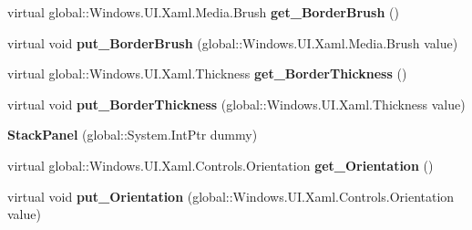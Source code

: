 \begin{DoxyCompactItemize}
\item 
\mbox{\label{class_windows_1_1_u_i_1_1_xaml_1_1_controls_1_1_stack_panel_ade57d63ba167e564115c51076407b86d}} 
virtual global\+::\+Windows.\+U\+I.\+Xaml.\+Media.\+Brush {\bfseries get\+\_\+\+Border\+Brush} ()
\item 
\mbox{\label{class_windows_1_1_u_i_1_1_xaml_1_1_controls_1_1_stack_panel_a9465b7d293751e261c9deb8f5bbc74f1}} 
virtual void {\bfseries put\+\_\+\+Border\+Brush} (global\+::\+Windows.\+U\+I.\+Xaml.\+Media.\+Brush value)
\item 
\mbox{\label{class_windows_1_1_u_i_1_1_xaml_1_1_controls_1_1_stack_panel_a9293dc30db12d0f3fb0b1465b4f79c8f}} 
virtual global\+::\+Windows.\+U\+I.\+Xaml.\+Thickness {\bfseries get\+\_\+\+Border\+Thickness} ()
\item 
\mbox{\label{class_windows_1_1_u_i_1_1_xaml_1_1_controls_1_1_stack_panel_a38a527c8e47cfb60586c9887434f6e3f}} 
virtual void {\bfseries put\+\_\+\+Border\+Thickness} (global\+::\+Windows.\+U\+I.\+Xaml.\+Thickness value)
\item 
\mbox{\label{class_windows_1_1_u_i_1_1_xaml_1_1_controls_1_1_stack_panel_ae651e05203c4e2a0ddc04022e050a4e7}} 
{\bfseries Stack\+Panel} (global\+::\+System.\+Int\+Ptr dummy)
\item 
\mbox{\label{class_windows_1_1_u_i_1_1_xaml_1_1_controls_1_1_stack_panel_a9834a2d1432003975ba8a69f4aa789c7}} 
virtual global\+::\+Windows.\+U\+I.\+Xaml.\+Controls.\+Orientation {\bfseries get\+\_\+\+Orientation} ()
\item 
\mbox{\label{class_windows_1_1_u_i_1_1_xaml_1_1_controls_1_1_stack_panel_a99d2c21e5e153b28fba470789fc1748a}} 
virtual void {\bfseries put\+\_\+\+Orientation} (global\+::\+Windows.\+U\+I.\+Xaml.\+Controls.\+Orientation value)
\item 
\mbox{\label{class_windows_1_1_u_i_1_1_xaml_1_1_controls_1_1_stack_panel_a86815ce8db81cb7b06e7beebaa97e788}} 

\end{DoxyCompactItemize}
